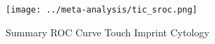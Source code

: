 \begin{figure}[p]
\centering

\texttt{[image: ../meta-analysis/tic\_sroc.png]}

\caption[Summary ROC Curve TIC]{Summary ROC Curve Touch Imprint Cytology}
\label{fig:tic_sroc}
\end{figure}
